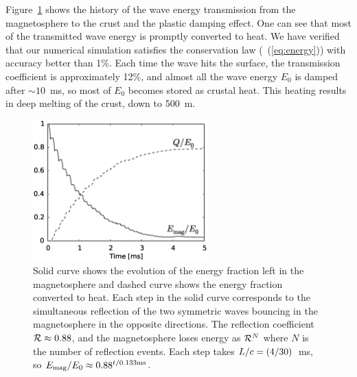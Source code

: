 Figure~\ref{fig6} shows the history of the wave energy transmission from the magnetosphere to the crust and the plastic damping effect. 
One can see that most of the transmitted wave energy is promptly converted to heat. We have verified that our numerical simulation satisfies the conservation law (\Eq~(\ref{eq:energy})) with accuracy better than 1\%. 
Each time the wave hits the surface, the transmission coefficient is approximately 12\%, and almost all the wave energy $E_0$ is damped after $\sim 10$~ms, so most of $E_0$ becomes stored as crustal heat. 
This heating results in deep melting of the crust, down to 500~m.
\begin{figure}[h]
\centering
\includegraphics[width=0.6\textwidth]{pics/chap3/fig6.eps} 
\caption[Energy evolution during the reflection of \alfven waves off the crust]{Solid curve shows the evolution of the energy fraction left in the magnetosphere and dashed curve shows the energy fraction converted to heat. 
Each step in the solid curve corresponds to the simultaneous reflection of the two 
symmetric waves bouncing in the magnetosphere in the opposite directions. 
The reflection coefficient ${\cal R}\approx 0.88$, and the magnetosphere loses 
energy as ${\cal R}^{N}$ where $N$ is the number of reflection events.
Each step takes $L/c=(4/30)$~ms, so $E_{\rm mag}/E_0\approx 0.88^{t/0.133\rm ms}$.}
\label{fig6}
\end{figure}

